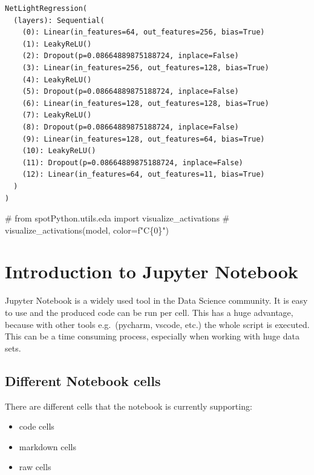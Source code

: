 \documentclass[
  letterpaper,
  DIV=11,
  numbers=noendperiod]{scrreprt}
\newenvironment{Shaded}{\begin{snugshade}}{\end{snugshade}}
\newcommand{\CommentTok}[1]{\textcolor[rgb]{0.37,0.37,0.37}{#1}}
\begin{document}
\begin{verbatim}
NetLightRegression(
  (layers): Sequential(
    (0): Linear(in_features=64, out_features=256, bias=True)
    (1): LeakyReLU()
    (2): Dropout(p=0.08664889875188724, inplace=False)
    (3): Linear(in_features=256, out_features=128, bias=True)
    (4): LeakyReLU()
    (5): Dropout(p=0.08664889875188724, inplace=False)
    (6): Linear(in_features=128, out_features=128, bias=True)
    (7): LeakyReLU()
    (8): Dropout(p=0.08664889875188724, inplace=False)
    (9): Linear(in_features=128, out_features=64, bias=True)
    (10): LeakyReLU()
    (11): Dropout(p=0.08664889875188724, inplace=False)
    (12): Linear(in_features=64, out_features=11, bias=True)
  )
)
\end{verbatim}

\begin{Shaded}
\begin{Highlighting}[]
\CommentTok{\# from spotPython.utils.eda import visualize\_activations}
\CommentTok{\# visualize\_activations(model, color=f"C\{0\}")}
\end{Highlighting}
\end{Shaded}

\cleardoublepage
{}
{}
\appendix

\chapter{Introduction to Jupyter
Notebook}\label{introduction-to-jupyter-notebook}

Jupyter Notebook is a widely used tool in the Data Science community. It
is easy to use and the produced code can be run per cell. This has a
huge advantage, because with other tools e.g.~(pycharm, vscode, etc.)
the whole script is executed. This can be a time consuming process,
especially when working with huge data sets.

\section{Different Notebook cells}\label{different-notebook-cells}

There are different cells that the notebook is currently supporting:

\begin{itemize}
\item
  code cells
\item
  markdown cells
\item
  raw cells
\end{itemize}
\end{document}
